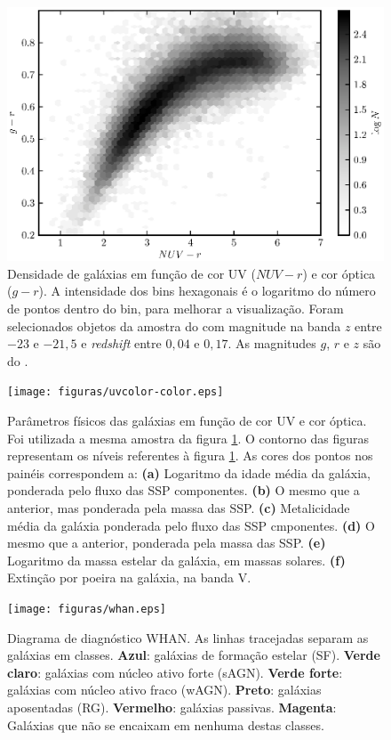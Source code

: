 \begin{figure}
	\includegraphics{figuras/uvcolor-color-density.eps}
	\caption[Densidade de galáxias no diagrama cor--cor UV.]
	{Densidade de galáxias em função de cor UV ($NUV-r$) e cor óptica ($g-r$). A
	intensidade dos bins hexagonais é o logaritmo do número de pontos dentro do
	bin, para melhorar a visualização. Foram selecionados objetos da amostra do
	\starlight com magnitude na banda $z$ entre $-23$ e $-21,5$ e {\em redshift}
	entre $0,04$ e $0,17$. As magnitudes $g$, $r$ e $z$ são do \SDSS.}
	\label{fig:DensityColor}
\end{figure}

\begin{figure}
	\texttt{[image: figuras/uvcolor-color.eps]}
	\caption[Diagrama cor--cor UV para os diversos parâmetros \starlight.]
	{Parâmetros físicos das galáxias em função de cor UV e cor óptica. Foi
	utilizada a mesma amostra da figura \ref{fig:DensityColor}. O contorno
	das figuras representam os níveis referentes à figura \ref{fig:DensityColor}.
	As cores dos pontos nos painéis correspondem a: {\bf (a)} Logaritmo da idade
	média da galáxia, ponderada pelo fluxo das SSP componentes. {\bf (b)} O mesmo
	que a anterior, mas ponderada pela massa das SSP. {\bf (c)} Metalicidade média
	da galáxia ponderada pelo fluxo das SSP cmponentes. {\bf (d)} O mesmo que a
	anterior, ponderada pela massa das SSP. {\bf (e)} Logaritmo da massa estelar da
	galáxia, em massas solares. {\bf (f)} Extinção por poeira na galáxia, na banda
	V.}
	\label{fig:ColorStarlightParam}
\end{figure}

\begin{figure}
	\texttt{[image: figuras/whan.eps]}
	\caption[Diagrama de diagnóstico WHAN.]
	{Diagrama de diagnóstico WHAN. As linhas tracejadas separam as galáxias
	em classes. {\bf Azul}: galáxias de formação estelar (SF). {\bf Verde
	claro}: galáxias com núcleo ativo forte (sAGN). {\bf Verde forte}:
	galáxias com núcleo ativo fraco (wAGN). {\bf Preto}: galáxias aposentadas
	(RG). {\bf Vermelho}: galáxias passivas. {\bf Magenta}: Galáxias que não se
	encaixam em nenhuma destas classes.}
	\label{fig:Whan}
\end{figure}

